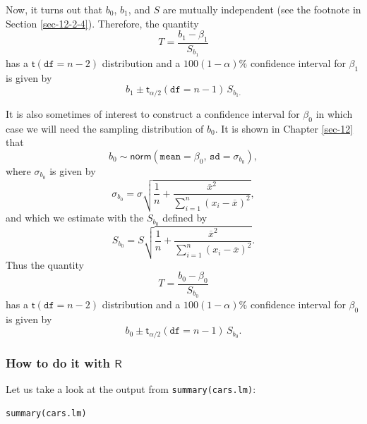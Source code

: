 \documentclass[captions=tableheading]{scrbook}
\begin{document}
Now, it turns out that \(b_{0}\), \(b_{1}\), and \(S\) are mutually independent (see the footnote in Section \ref{sec-12-2-4}). Therefore, the quantity
\begin{equation}
T=\frac{b_{1}-\beta_{1}}{S_{b_{1}}}
\end{equation}
has a \(\mathsf{t}(\mathtt{df}=n-2)\) distribution and a \(100(1 - \alpha)\% \) confidence interval for \(\beta_{1}\) is given by 
\begin{equation}
b_{1}\pm\mathsf{t}_{\alpha/2}(\mathtt{df}=n-1)\, S_{b_{1}.}
\end{equation}

It is also sometimes of interest to construct a confidence interval for \(\beta_{0}\) in which case we will need the sampling distribution of \(b_{0}\). It is shown in Chapter \ref{sec-12} that
\begin{equation}
b_{0}\sim\mathsf{norm}\left(\mathtt{mean}=\beta_{0},\,\mathtt{sd}=\sigma_{b_{0}}\right),
\end{equation}
where \(\sigma_{b_{0}}\) is given by
\begin{equation}
\sigma_{b_{0}}=\sigma\sqrt{\frac{1}{n}+\frac{\overline{x}^{2}}{\sum_{i=1}^{n}(x_{i}-\overline{x})^{2}}},
\end{equation}
and which we estimate with the \(S_{b_{0}}\) defined by
\begin{equation}
S_{b_{0}}=S\sqrt{\frac{1}{n}+\frac{\overline{x}^{2}}{\sum_{i=1}^{n}(x_{i}-\overline{x})^{2}}}.
\end{equation}
Thus the quantity
\begin{equation}
T=\frac{b_{0}-\beta_{0}}{S_{b_{0}}}
\end{equation}
has a \(\mathsf{t}(\mathtt{df}=n-2)\) distribution and a \(100(1-\alpha)\%\) confidence interval for \(\beta_{0}\) is given by
\begin{equation}
b_{0}\pm\mathsf{t}_{\alpha/2}(\mathtt{df}=n-1)\, S_{b_{0}}.
\end{equation}
\subsubsection{How to do it with \(\mathsf{R}\)}
\label{sec-11-2-4-1}




Let us take a look at the output from \texttt{summary(cars.lm)}:


\lstset{language=R}
\begin{lstlisting}
summary(cars.lm)
\end{lstlisting}
\end{document}
